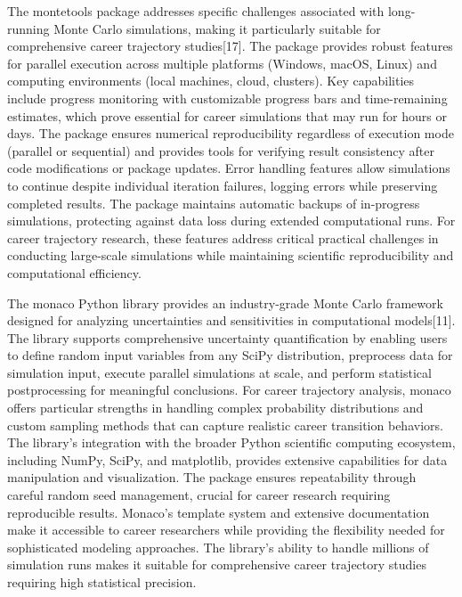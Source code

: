 \documentclass[main.tex]{subfiles}
\begin{document}

The montetools package addresses specific challenges associated with long-running Monte Carlo simulations, making it particularly suitable for comprehensive career trajectory studies[17]. The package provides robust features for parallel execution across multiple platforms (Windows, macOS, Linux) and computing environments (local machines, cloud, clusters). Key capabilities include progress monitoring with customizable progress bars and time-remaining estimates, which prove essential for career simulations that may run for hours or days. The package ensures numerical reproducibility regardless of execution mode (parallel or sequential) and provides tools for verifying result consistency after code modifications or package updates. Error handling features allow simulations to continue despite individual iteration failures, logging errors while preserving completed results. The package maintains automatic backups of in-progress simulations, protecting against data loss during extended computational runs. For career trajectory research, these features address critical practical challenges in conducting large-scale simulations while maintaining scientific reproducibility and computational efficiency.


The monaco Python library provides an industry-grade Monte Carlo framework designed for analyzing uncertainties and sensitivities in computational models[11]. The library supports comprehensive uncertainty quantification by enabling users to define random input variables from any SciPy distribution, preprocess data for simulation input, execute parallel simulations at scale, and perform statistical postprocessing for meaningful conclusions. For career trajectory analysis, monaco offers particular strengths in handling complex probability distributions and custom sampling methods that can capture realistic career transition behaviors. The library's integration with the broader Python scientific computing ecosystem, including NumPy, SciPy, and matplotlib, provides extensive capabilities for data manipulation and visualization. The package ensures repeatability through careful random seed management, crucial for career research requiring reproducible results. Monaco's template system and extensive documentation make it accessible to career researchers while providing the flexibility needed for sophisticated modeling approaches. The library's ability to handle millions of simulation runs makes it suitable for comprehensive career trajectory studies requiring high statistical precision.
\end{document}
